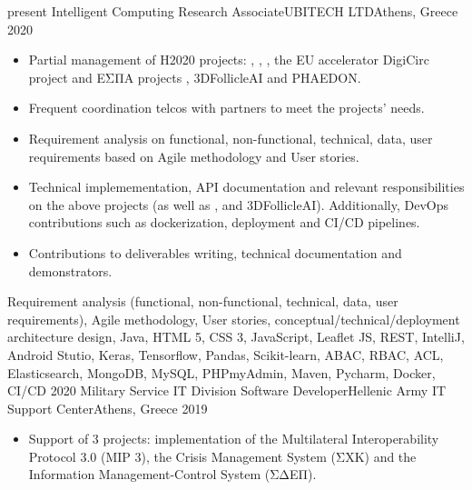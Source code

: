 \begin{experiences}
\experience
    {present}   {Intelligent Computing Research Associate}{UBITECH LTD}{Athens, Greece}
    {2020} {
                    \begin{itemize}
                      \item Partial management of H2020 projects: , , , the EU accelerator DigiCirc project  and ΕΣΠΑ projects , 3DFollicleAI and PHAEDON.

                      \item Frequent coordination telcos with partners to meet the projects' needs.

                      \item Requirement analysis on functional, non-functional, technical, data, user requirements based on Agile methodology and User stories.

                      \item Technical implemementation, API documentation and relevant responsibilities on the above projects (as well as ,  and 3DFollicleAI). Additionally, DevOps contributions such as dockerization, deployment and CI/CD pipelines.

                      \item Contributions to deliverables writing, technical documentation and demonstrators.

                    \end{itemize}
                    }
                    {Requirement analysis (functional, non-functional, technical, data, user requirements), Agile methodology, User stories, conceptual/technical/deployment architecture design, Java, HTML 5, CSS 3, JavaScript, Leaflet JS, REST, IntelliJ, Android Stutio, Keras, Tensorflow, Pandas, Scikit-learn, ABAC, RBAC, ACL, Elasticsearch, MongoDB, MySQL, PHPmyAdmin, Maven, Pycharm, Docker, CI/CD}
  \emptySeparator
  \experience
    {2020}   {Military Service IT Division Software Developer}{Hellenic Army IT Support Center}{Athens, Greece}
    {2019} {
                    \begin{itemize}
                      \item Support of 3 projects: implementation of the Multilateral Interoperability Protocol 3.0 (MIP 3), the Crisis Management System (ΣΧΚ) 
                      and the Information Management-Control System (ΣΔΕΠ).


\end{itemize}}
\end{experiences}
